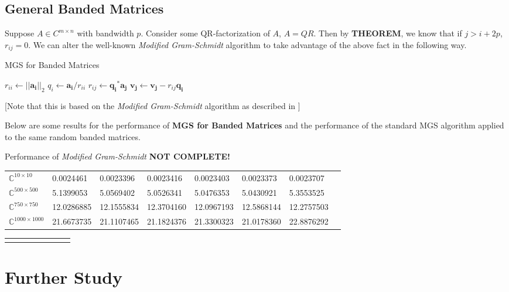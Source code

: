 \documentclass{article}
\numberwithin{pic}{section}
\numberwithin{lem}{section}
\numberwithin{thm}{section}
\numberwithin{cor}{section}
\theoremstyle{definition}
\numberwithin{ex}{section}
\numberwithin{defn}{section}
\theoremstyle{definition}
\theoremstyle{remark}
\newcommand{\set}[1]{\ensuremath{\left\{ #1\right\}}} %
\newcommand{\C}{\ensuremath{\mathbb{C}}} %
\newcommand{\norm}[1]{\ensuremath{\left | \left | #1 \right | \right |}}
\begin{document}
\subsection{General Banded Matrices}
Suppose $A\in C^{m\times n}$ with bandwidth $p$. Consider some QR-factorization
of $A$, $A = QR$. Then by \textbf{THEOREM}, we
know that if $j > i + 2p$, $r_{ij} = 0$. We can alter the well-known
\textit{Modified Gram-Schmidt} algorithm to take advantage of the above fact in
the following way.
\begin{algorithm}
  \caption{MGS for Banded Matrices}
  \begin{algorithmic}[1]
    \State$r_{ii}\gets \norm{\mathbf{a_i}}_2$
    \State$q_i\gets \mathbf{a_i} / r_{ii}$
    \For{$j = i + 1$\textbf{ to }$\text{min}\set{i + 2p, n}$}
    \State$r_{ij}\gets \mathbf{q_i}^*\mathbf{a_j}$
    \State$\mathbf{v_j}\gets\mathbf{v_j} - r_{ij}\mathbf{q_i}$
    \EndFor
    \EndFor
  \end{algorithmic}
  [Note that this is based on the \textit{Modified
    Gram-Schmidt} algorithm as described in \cite{nla}] 
\end{algorithm}
Below are some results for the performance of \textbf{MGS for Banded Matrices}
and the performance of the standard MGS algorithm applied to the same random
banded matrices.
\begin{center}
 Performance of \textit{Modified Gram-Schmidt} \textbf{NOT COMPLETE!}
\begin{tabular}{p{2cm}|p{2cm}p{2cm}p{2cm}p{2cm}p{2cm}p{2cm}p{2cm}}
    $\C^{10\times 10}$ & 0.0024461 &   0.0023396 &   0.0023416 &   0.0023403  &  0.0023373  &  0.0023707\\
    $\C^{500\times 500}$& 5.1399053  &  5.0569402   & 5.0526341  &  5.0476353 &   5.0430921  &  5.3553525\\
   $\C^{750\times 750}$& 12.0286885  & 12.1555834  & 12.3704160  & 12.0967193 &  12.5868144  & 12.2757503\\
  $\C^{1000\times 1000}$& 21.6673735  & 21.1107465  & 21.1824376  & 21.3300323  & 21.0178360  & 22.8876292 
\end{tabular}
\end{center}
\begin{center}
  \begin{tabular}{p{1cm}|p{2cm}p{2cm}p{2cm}p{2cm}p{2cm}p{2cm}p{2cm}}
    & & & & & &
  \end{tabular}
\end{center}
\section{Further Study}
	
	
\end{document}

